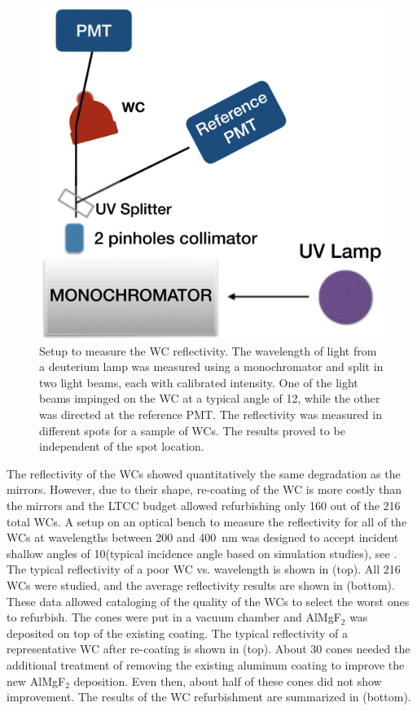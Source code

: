 \begin{figure}
	\centering
	\includegraphics[width=0.98\columnwidth,keepaspectratio]{img/wcSetup.png}
	\caption{Setup to measure the WC reflectivity. The wavelength of light from a deuterium lamp was measured
          using a monochromator and split in two light beams, each with calibrated intensity. One of the light beams
          impinged on the WC at a typical angle of 12\mdeg, while the other was directed at the reference PMT. The
          reflectivity was measured in different spots for a sample of WCs.  The results proved to be independent of
          the spot location.}
	\label{fig:wcSetup}
\end{figure}

The reflectivity of the WCs showed quantitatively the same degradation as the mirrors. However, due to their shape,
re-coating of the WC is more costly than the mirrors and the LTCC budget allowed refurbishing only 160 out of the
216 total WCs.
A setup on an optical bench to measure the reflectivity for all of the WCs at wavelengths between 200 and 400~nm
was designed to
accept incident shallow angles of 10\mdeg (typical incidence angle based on simulation studies), see .
The typical reflectivity of a poor WC vs. wavelength is shown in  (top).
All 216 WCs were studied, and the average reflectivity results are shown in  (bottom).
These data allowed cataloging of the quality of the WCs to select the worst ones to refurbish.
The cones were put in a vacuum chamber and AlMgF$_2$ was deposited on top of the existing coating.
The typical reflectivity of a representative WC after re-coating is shown in  (top).
About 30 cones needed the additional treatment of removing the existing aluminum coating to improve the new AlMgF$_2$ deposition.
Even then, about half of these cones did not show improvement.
The results of the WC refurbishment are summarized in  (bottom).

